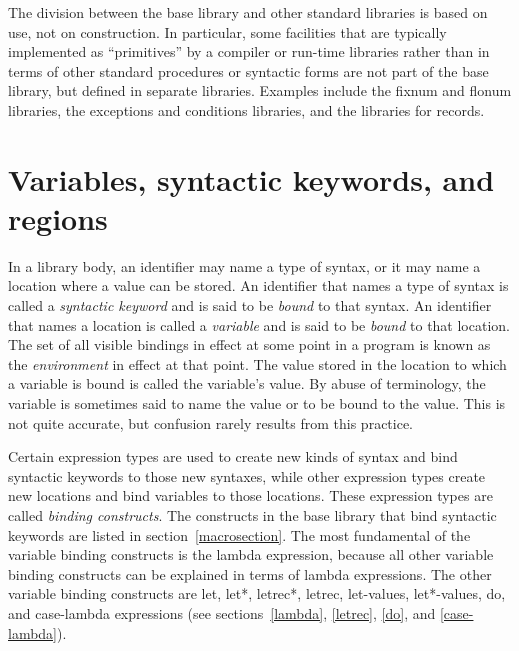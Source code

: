 The division between the base library and other standard libraries is
based on use, not on construction.  In particular, some facilities
that are typically implemented as ``primitives'' by a compiler or
run-time libraries rather than in terms of other standard procedures
 or syntactic forms are not part of the base library, but defined in
separate libraries.  Examples include the fixnum and flonum libraries,
the exceptions and conditions libraries, and the libraries for
records.

\section{Variables, syntactic keywords, and regions}
\label{specialformsection}
\label{variablesection}

In a library body,
an identifier may name a type of syntax, or it may name
a location where a value can be stored.  An identifier that names a type
of syntax is called a {\em syntactic keyword}
and is said to be {\em bound} to that syntax.  An identifier that names a
location is called a {\em variable} and is said to be
{\em bound} to that location.  The set of all visible
bindings in effect at some point in a program is
known as the {\em environment} in effect at that point.  The value
stored in the location to which a variable is bound is called the
variable's value.  By abuse of terminology, the variable is sometimes
said to name the value or to be bound to the value.  This is not quite
accurate, but confusion rarely results from this practice.



\vest Certain expression types are used to create new kinds of syntax
and bind syntactic keywords to those new syntaxes, while other
expression types create new locations and bind variables to those
locations.  These expression types are called {\em binding constructs}.
The constructs in the base library that bind syntactic keywords are listed in section~\ref{macrosection}.
The most fundamental of the variable binding constructs is the
{\cf lambda} expression, because all other variable binding constructs
can be explained in terms of {\cf lambda} expressions.  The other
variable binding constructs are {\cf let}, {\cf let*}, {\cf letrec*},
{\cf letrec}, {\cf let-values}, {\cf let*-values}, {\cf do}, and {\cf
  case-lambda} expressions (see sections~\ref{lambda}, \ref{letrec}, 
\ref{do}, and \ref{case-lambda}).

